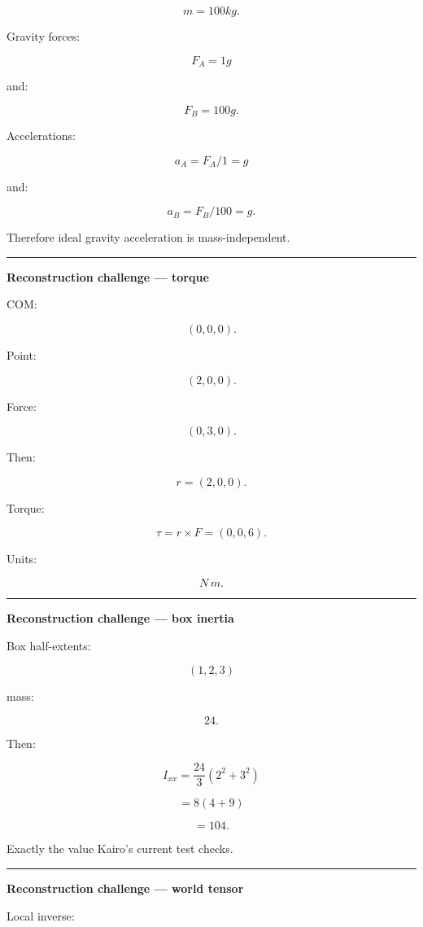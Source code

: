 \[
m=100kg.
\]

Gravity forces:

\[
F_A=1g
\]

and:

\[
F_B=100g.
\]

Accelerations:

\[
a_A=
F_A/1=g
\]

and:

\[
a_B=
F_B/100=g.
\]

Therefore ideal gravity acceleration is mass-independent.

\begin{center}\rule{0.5\linewidth}{0.5pt}\end{center}

\textbf{Reconstruction challenge --- torque}

COM:

\[
(0,0,0).
\]

Point:

\[
(2,0,0).
\]

Force:

\[
(0,3,0).
\]

Then:

\[
r=(2,0,0).
\]

Torque:

\[
\tau
=
r\times F
=
(0,0,6).
\]

Units:

\[
N\,m.
\]

\begin{center}\rule{0.5\linewidth}{0.5pt}\end{center}

\textbf{Reconstruction challenge --- box inertia}

Box half-extents:

\[
(1,2,3)
\]

mass:

\[
24.
\]

Then:

\[
I_{xx}
=
\frac{24}{3}
(2^2+3^2)
\]

\[
=
8(4+9)
\]

\[
=
104.
\]

Exactly the value Kairo's current test checks.

\begin{center}\rule{0.5\linewidth}{0.5pt}\end{center}

\textbf{Reconstruction challenge --- world tensor}

Local inverse:

